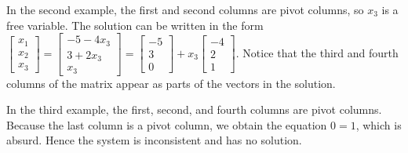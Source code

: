 \begin{example}
In the second example, the first and second columns are pivot columns, so $x_3$ is a free variable.  The solution can be written in the form 
$\begin{bmatrix}x_1\\x_2\\x_3\end{bmatrix} = \begin{bmatrix}-5-4x_3\\3+2x_3\\x_3\end{bmatrix} = \begin{bmatrix}-5\\3\\0\end{bmatrix} + x_3 \begin{bmatrix}-4\\2\\1\end{bmatrix}$.  Notice that the third and fourth columns of the matrix appear as parts of the vectors in the solution.
\end{example}

\begin{example}
In the third example, the first, second, and fourth columns are pivot columns. Because the last column is a pivot column, we obtain the equation $0=1$, which is absurd.  Hence the system is inconsistent and has no solution.
\end{example}

